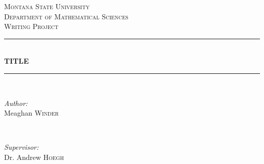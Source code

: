 \documentclass[12pt]{article}\usepackage[]{graphicx}\usepackage[]{color}
\begin{document}
\begin{titlepage}

\newcommand{\HRule}{\rule{\linewidth}{0.5mm}} %

\center %
 

\textsc{\LARGE Montana State University}\\[0.5cm] %
\textsc{\Large Department of Mathematical Sciences}\\[0.5cm] %
\textsc{\large Writing Project}\\[.75cm] %


\HRule \\[0.4cm]
{ \huge \bfseries TITLE }\\[0.4cm] %
\HRule \\[1.5cm]
 

\begin{minipage}{0.4\textwidth}
\begin{flushleft} 
\large
\emph{Author:} \\
Meaghan \textsc{Winder} \\
\end{flushleft}
\end{minipage}
~
\begin{minipage}{0.4\textwidth}
\begin{flushright} 
\large
\emph{Supervisor:} \\
Dr. Andrew \textsc{Hoegh} 
\end{flushright}
\end{minipage}\\[1.5cm]



\end{titlepage}
\end{document}
